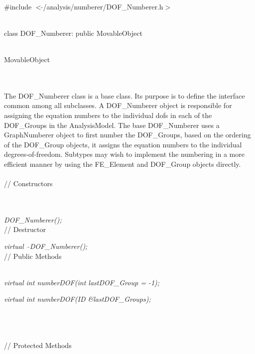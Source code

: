 
   \\
\#include $<\tilde{ }$/analysis/numberer/DOF\_Numberer.h$>$  


  \\
class DOF\_Numberer: public MovableObject  


 \\
MovableObject 

\indent{} \\

 \\ 
\indent The DOF\_Numberer class is a base class. Its purpose is
to define the interface common among all subclasses.  A DOF\_Numberer
object is responsible for assigning the equation numbers to the
individual dofs in each of the  DOF\_Groups in the AnalysisModel. The
base DOF\_Numberer uses a GraphNumberer object to first number the
DOF\_Groups, based on the ordering of the DOF\_Group objects, it
assigns the equation numbers to the individual
degrees-of-freedom. Subtypes may wish to implement the numbering in
a more efficient manner by using the FE\_Element and DOF\_Group objects
directly. \\


 \\
// Constructors 

\\ 
\\ 
{\em DOF\_Numberer();}\\  

// Destructor 

{\em virtual~ $\tilde{}$DOF\_Numberer();}\\  

// Public Methods 

 \\ 
{\em virtual int numberDOF(int lastDOF\_Group = -1);} 

{\em virtual int numberDOF(ID \&lastDOF\_Groups);} 

\\ 
\\ \\
// Protected Methods  

